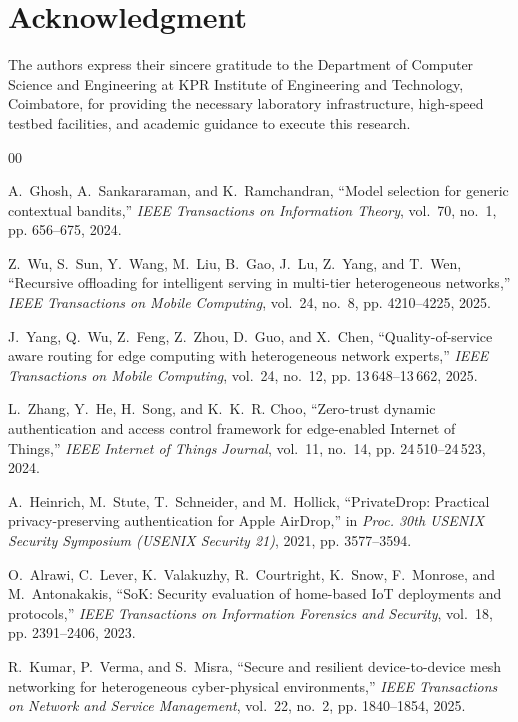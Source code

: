 \documentclass[conference]{IEEEtran}
\begin{document}
\section*{Acknowledgment}
The authors express their sincere gratitude to the Department of Computer Science and Engineering at KPR Institute of Engineering and Technology, Coimbatore, for providing the necessary laboratory infrastructure, high-speed testbed facilities, and academic guidance to execute this research.

\begin{thebibliography}{00}

A.~Ghosh, A.~Sankararaman, and K.~Ramchandran, ``Model selection for generic contextual bandits,'' \emph{IEEE Transactions on Information Theory}, vol.~70, no.~1, pp. 656--675, 2024.

Z.~Wu, S.~Sun, Y.~Wang, M.~Liu, B.~Gao, J.~Lu, Z.~Yang, and T.~Wen, ``Recursive offloading for intelligent serving in multi-tier heterogeneous networks,'' \emph{IEEE Transactions on Mobile Computing}, vol.~24, no.~8, pp. 4210--4225, 2025.

J.~Yang, Q.~Wu, Z.~Feng, Z.~Zhou, D.~Guo, and X.~Chen, ``Quality-of-service aware routing for edge computing with heterogeneous network experts,'' \emph{IEEE Transactions on Mobile Computing}, vol.~24, no.~12, pp. 13\,648--13\,662, 2025.

L.~Zhang, Y.~He, H.~Song, and K.~K.~R. Choo, ``Zero-trust dynamic authentication and access control framework for edge-enabled Internet of Things,'' \emph{IEEE Internet of Things Journal}, vol.~11, no.~14, pp. 24\,510--24\,523, 2024.

A.~Heinrich, M.~Stute, T.~Schneider, and M.~Hollick, ``PrivateDrop: Practical privacy-preserving authentication for Apple AirDrop,'' in \emph{Proc. 30th USENIX Security Symposium (USENIX Security 21)}, 2021, pp. 3577--3594.

O.~Alrawi, C.~Lever, K.~Valakuzhy, R.~Courtright, K.~Snow, F.~Monrose, and M.~Antonakakis, ``SoK: Security evaluation of home-based IoT deployments and protocols,'' \emph{IEEE Transactions on Information Forensics and Security}, vol.~18, pp. 2391--2406, 2023.

R.~Kumar, P.~Verma, and S.~Misra, ``Secure and resilient device-to-device mesh networking for heterogeneous cyber-physical environments,'' \emph{IEEE Transactions on Network and Service Management}, vol.~22, no.~2, pp. 1840--1854, 2025.


\end{thebibliography}
\end{document}
